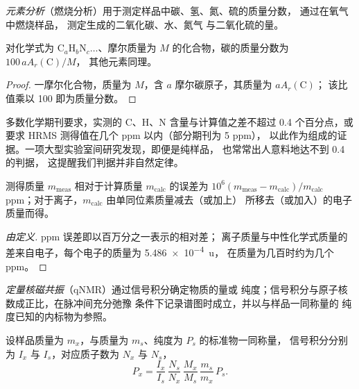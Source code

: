 \begin{definition}[元素分析]\label{def:b3:lab-techniques-3:elemental}
\emph{元素分析}（燃烧分析）用于测定样品中碳、氢、氮、硫的质量分数，
通过在氧气中燃烧样品，
测定生成的二氧化碳、水、氮气
与二氧化硫的量。
\end{definition}

\begin{proposition}[由化学式求质量分数]\label{prop:b3:lab-techniques-3:mass-fractions}
对化学式为 $\mathrm{C}_a\mathrm{H}_b\mathrm{N}_c\dots$、摩尔质量为 $M$ 的化合物，碳的质量分数为 $100\,aA_r(\mathrm C)/M$，
其他元素同理。
\end{proposition}

\begin{proof}
一摩尔化合物，质量为 $M$，含 $a$ 摩尔碳原子，其质量为 $aA_r(\mathrm C)$；
该比值乘以 100 即为质量分数。
\end{proof}

多数化学期刊要求，实测的 C、H、N 含量与计算值之差不超过
0.4 个百分点，或要求 HRMS 测得值在几个 ppm 以内（部分期刊为 5 ppm），
以此作为组成的证据。一项大型实验室间研究发现，即便是纯样品，
也常常出人意料地达不到 0.4 的判据，
这提醒我们判据并非自然定律。

\begin{proposition}[HRMS 误差]\label{prop:b3:lab-techniques-3:ppm-error}
测得质量 $m_{\mathrm{meas}}$ 相对于计算质量 $m_{\mathrm{calc}}$ 的误差为
$10^6(m_{\mathrm{meas}} - m_{\mathrm{calc}})/m_{\mathrm{calc}}$ ppm；对于离子，$m_{\mathrm{calc}}$ 由单同位素质量减去（或加上）
所移去（或加入）的电子质量而得。
\end{proposition}

\begin{proof}[由定义]
ppm 误差即以百万分之一表示的相对差；
离子质量与中性化学式质量的差来自电子，每个电子的质量为 \qty{5.486e-4}{u}，
在质量为几百时约为几个 ppm。
\end{proof}

\begin{definition}[定量核磁共振]\label{def:b3:lab-techniques-3:qnmr}
\emph{定量核磁共振}（qNMR）通过信号积分确定物质的量或
纯度；信号积分与原子核数成正比，在脉冲间充分弛豫
条件下记录谱图时成立，并以与样品一同称量的
纯度已知的内标物为参照。
\end{definition}

\begin{proposition}[定量核磁共振纯度]\label{prop:b3:lab-techniques-3:qnmr}
设样品质量为 $m_x$，与质量为 $m_s$、纯度为 $P_s$ 的标准物一同称量，
信号积分分别为 $I_x$ 与 $I_s$，对应质子数为 $N_x$ 与 $N_s$，
\[
  P_x = \frac{I_x}{I_s}\,\frac{N_s}{N_x}\,\frac{M_x}{M_s}\,\frac{m_s}{m_x}\,P_s.
\]
\end{proposition}

